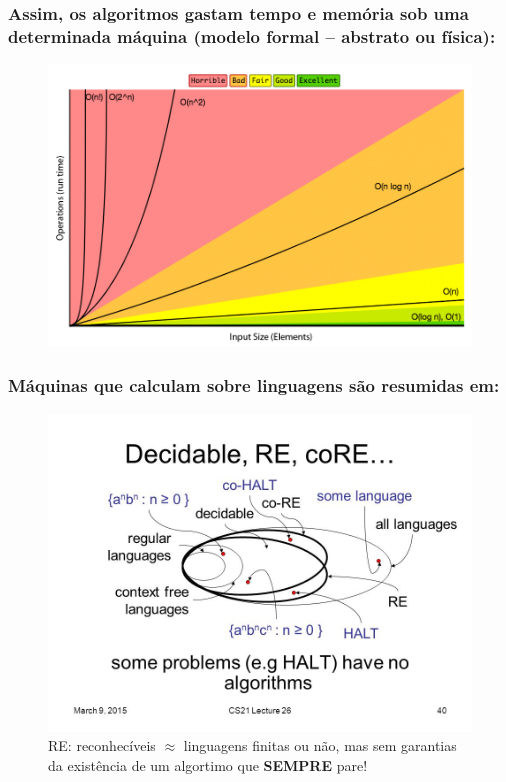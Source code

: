 \documentclass[10pt]{beamer}
\begin{document}


\begin{frame}[fragile]

\frametitle{Assim, os   algoritmos  gastam tempo e memória sob uma determinada máquina (modelo formal -- abstrato ou física):}

\begin{figure}[!ht]
	\centering
	\includegraphics[height =.65\textheight,width=.8\textwidth]
	{figuras/complexidade_algo.png}
\end{figure}

\end{frame}


\begin{frame}[fragile]

\frametitle{Máquinas que calculam sobre linguagens são resumidas em:}

\begin{figure}[!ht]
\centering
\includegraphics[height =.65\textheight,width=.85\textwidth]
{figuras/some+problems+have+no+algorithms_HALT.jpg}
\caption{RE: reconhecíveis $\approx $ linguagens finitas ou não, mas sem garantias da existência de um algortimo que \textbf{SEMPRE} pare!}
\end{figure}

\end{frame}
\end{document}
